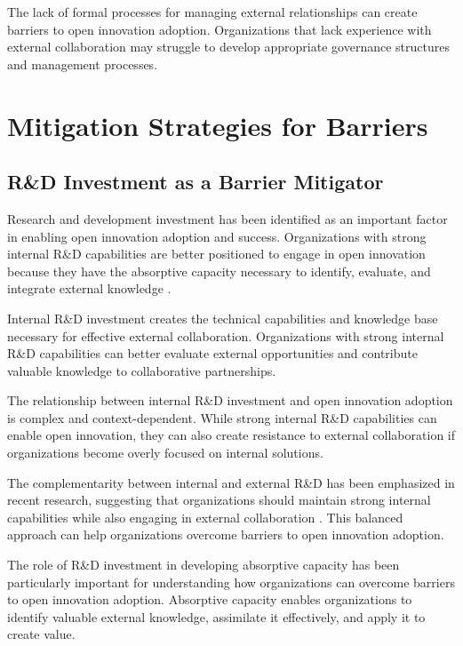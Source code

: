 \documentclass[12pt,a4paper]{article}
\begin{document}
The lack of formal processes for managing external relationships can create barriers to open innovation adoption. Organizations that lack experience with external collaboration may struggle to develop appropriate governance structures and management processes.

\section{Mitigation Strategies for Barriers}

\subsection{R\&D Investment as a Barrier Mitigator}

Research and development investment has been identified as an important factor in enabling open innovation adoption and success. Organizations with strong internal R\&D capabilities are better positioned to engage in open innovation because they have the absorptive capacity necessary to identify, evaluate, and integrate external knowledge \cite{cohen1990absorptive}.

Internal R\&D investment creates the technical capabilities and knowledge base necessary for effective external collaboration. Organizations with strong internal R\&D capabilities can better evaluate external opportunities and contribute valuable knowledge to collaborative partnerships.

The relationship between internal R\&D investment and open innovation adoption is complex and context-dependent. While strong internal R\&D capabilities can enable open innovation, they can also create resistance to external collaboration if organizations become overly focused on internal solutions.

The complementarity between internal and external R\&D has been emphasized in recent research, suggesting that organizations should maintain strong internal capabilities while also engaging in external collaboration \cite{cassiman2006inbound}. This balanced approach can help organizations overcome barriers to open innovation adoption.

The role of R\&D investment in developing absorptive capacity has been particularly important for understanding how organizations can overcome barriers to open innovation adoption. Absorptive capacity enables organizations to identify valuable external knowledge, assimilate it effectively, and apply it to create value.
\end{document}
